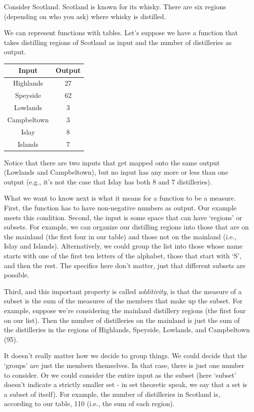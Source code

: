 \documentclass[]{tufte-book}
\begin{document}
Consider Scotland. Scotland is known for its whisky. There are six regions (depending on who you ask) where whisky is distilled.

We can represent functions with tables. Let's suppose we have a function that takes distilling regions of Scotland as input and the number of distilleries as output.

\begin{longtable}[]{@{}cc@{}}
\toprule
Input & Output\tabularnewline
\midrule
\endhead
Highlands & 27\tabularnewline
Speyside & 62\tabularnewline
Lowlands & 3\tabularnewline
Campbeltown & 3\tabularnewline
Islay & 8\tabularnewline
Islands & 7\tabularnewline
\bottomrule
\end{longtable}

Notice that there are two inputs that get mapped onto the same output (Lowlands and Campbeltown), but no input has any more or less than one output (e.g., it's not the case that Islay has both 8 and 7 distilleries).

What we want to know next is what it means for a function to be a measure. First, the function has to have non-negative numbers as output. Our example meets this condition. Second, the input is some space that can have `regions' or subsets. For example, we can organize our distilling regions into those that are on the mainland (the first four in our table) and those not on the mainland (i.e., Islay and Islands). Alternatively, we could group the list into those whose name starts with one of the first ten letters of the alphabet, those that start with `S', and then the rest. The specifics here don't matter, just that different subsets are possible.

Third, and this important property is called \emph{additivity}, is that the measure of a subset is the sum of the measures of the members that make up the subset. For example, suppose we're considering the mainland distillery regions (the first four on our list). Then the number of distilleries on the mainland is just the sum of the distilleries in the regions of Highlands, Speyside, Lowlands, and Campbeltown (95).

It doesn't really matter how we decide to group things. We could decide that the `groups' are just the members themselves. In that case, there is just one number to consider. Or we could consider the entire input as the subset (here `subset' doesn't indicate a strictly smaller set - in set theoretic speak, we say that a set is a subset of itself). For example, the number of distilleries in Scotland is, according to our table, 110 (i.e., the sum of each region).
\end{document}
